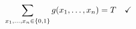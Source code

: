 \documentclass[preview]{standalone}
\begin{document}
\begin{align*}
\special{dvisvgm:raw <g id='unique000'>}\sum_{x_1,\ldots,x_n \in \{0,1\}} g(x_1,\ldots,x_n) = T \quad \checkmark\special{dvisvgm:raw </g>}
\end{align*}
\end{document}
